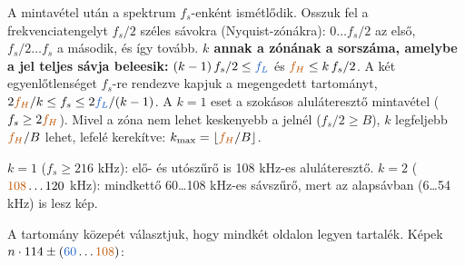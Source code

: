 A mintavétel után a spektrum $f_s$-enként ismétlődik. Osszuk fel a frekvenciatengelyt $f_s/2$ széles sávokra (Nyquist-zónákra): $0\ldots f_s/2$ az első, $f_s/2\ldots f_s$ a második, és így tovább. \textbf{$k$ annak a zónának a sorszáma, amelybe a jel teljes sávja beleesik:} $(k-1)\,f_s/2\le {\ca{f_L}}$ és ${\cb{f_H}}\le k\,f_s/2$. A két egyenlőtlenséget $f_s$-re rendezve kapjuk a megengedett tartományt, $2{\cb{f_H}}/k\le f_s\le2{\ca{f_L}}/(k-1)$. A $k=1$ eset a szokásos aluláteresztő mintavétel ($f_s\ge2{\cb{f_H}}$). Mivel a zóna nem lehet keskenyebb a jelnél ($f_s/2\ge B$), $k$ legfeljebb ${\cb{f_H}}/B$ lehet, lefelé kerekítve: $k_{\max}=\lfloor {\cb{f_H}}/B\rfloor$.



\begin{center}\end{center}

\begin{center}\end{center}

$k=1$ ($f_s\ge216$ kHz): elő- és utószűrő is 108 kHz-es aluláteresztő. $k=2$ (${\cb{108}}\ldots120$ kHz): mindkettő 60\ldots{}108 kHz-es sávszűrő, mert az alapsávban (6\ldots{}54 kHz) is lesz kép.

A tartomány közepét választjuk, hogy mindkét oldalon legyen tartalék. Képek $n\cdot114\pm({\ca{60}}\ldots{\cb{108}})$:

\begin{center}\end{center}

